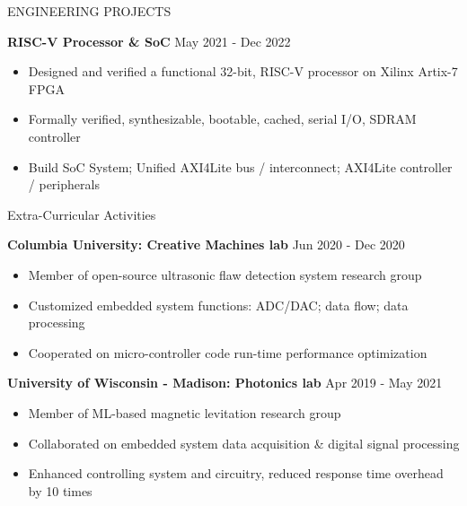 \documentclass{resume} %
\begin{document}

  \begin{rSection}{ENGINEERING PROJECTS}

    \textbf{RISC-V Processor \& SoC}        \hfill May 2021 - Dec 2022\\
    \LineShrinkBeforeItem
    \begin{itemize} [leftmargin=1em]
      \itemsep -0.6em
      \item Designed and verified a functional 32-bit, RISC-V processor on Xilinx Artix-7 FPGA
      \item Formally verified, synthesizable, bootable, cached, serial I/O, SDRAM controller
      \item Build SoC System; Unified AXI4Lite bus / interconnect; AXI4Lite controller / peripherals
    \end{itemize}


  \end{rSection}


  \begin{rSection}{Extra-Curricular Activities}

    \textbf{Columbia University: Creative Machines lab}         \hfill Jun 2020 - Dec 2020\\
    \LineShrinkBeforeItem
    \begin{itemize} [leftmargin=1em]
      \itemsep -0.6em
      \item Member of open-source ultrasonic flaw detection system research group
      \item Customized embedded system functions: ADC/DAC; data flow; data processing
      \item Cooperated on micro-controller code run-time performance optimization
    \end{itemize}


    \textbf{University of Wisconsin - Madison: Photonics lab}   \hfill Apr 2019 - May 2021\\
    \LineShrinkBeforeItem
    \begin{itemize} [leftmargin=1em]
      \itemsep -0.6em
      \item Member of ML-based magnetic levitation research group
      \item Collaborated on embedded system data acquisition \& digital signal processing
      \item Enhanced controlling system and circuitry, reduced response time overhead by 10 times
    \end{itemize}

  \end{rSection}
\end{document}
